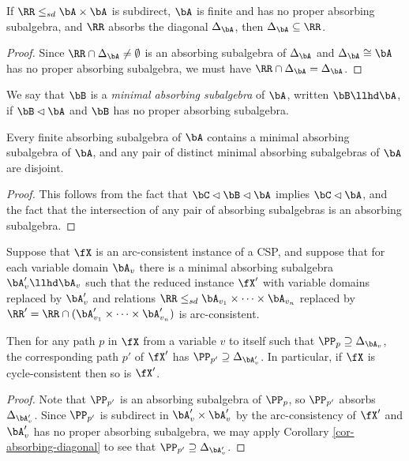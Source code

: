 \begin{cor}\label{cor-absorbing-diagonal} If $\RR \le_{sd} \bA\times \bA$ is subdirect, $\bA$ is finite and has no proper absorbing subalgebra, and $\RR$ absorbs the diagonal $\Delta_\bA$, then $\Delta_\bA \subseteq \RR$.
\end{cor}
\begin{proof} Since $\RR \cap \Delta_{\bA} \ne \emptyset$ is an absorbing subalgebra of $\Delta_{\bA}$ and $\Delta_{\bA} \cong \bA$ has no proper absorbing subalgebra, we must have $\RR \cap \Delta_\bA = \Delta_\bA$.
\end{proof}

\begin{defn} We say that $\bB$ is a \emph{minimal absorbing subalgebra} of $\bA$, written $\bB \llhd \bA$, if $\bB \lhd \bA$ and $\bB$ has no proper absorbing subalgebra.
\end{defn}

\begin{prop} Every finite absorbing subalgebra of $\bA$ contains a minimal absorbing subalgebra of $\bA$, and any pair of distinct minimal absorbing subalgebras of $\bA$ are disjoint.
\end{prop}
\begin{proof} This follows from the fact that $\bC \lhd \bB \lhd \bA$ implies $\bC \lhd \bA$, and the fact that the intersection of any pair of absorbing subalgebras is an absorbing subalgebra.
\end{proof}

\begin{thm}\label{arc-consistent-cycles} Suppose that $\fX$ is an arc-consistent instance of a CSP, and suppose that for each variable domain $\bA_v$ there is a minimal absorbing subalgebra $\bA_v' \llhd \bA_v$ such that the reduced instance $\fX'$ with variable domains replaced by $\bA_v'$ and relations $\RR \le_{sd} \bA_{v_1} \times \cdots \times \bA_{v_n}$ replaced by $\RR' = \RR \cap (\bA_{v_1}' \times \cdots \times \bA_{v_n}')$ is arc-consistent.

Then for any path $p$ in $\fX$ from a variable $v$ to itself such that $\PP_p \supseteq \Delta_{\bA_v}$, the corresponding path $p'$ of $\fX'$ has $\PP_{p'} \supseteq \Delta_{\bA_v'}$. In particular, if $\fX$ is cycle-consistent then so is $\fX'$.
\end{thm}
\begin{proof} Note that $\PP_{p'}$ is an absorbing subalgebra of $\PP_p$, so $\PP_{p'}$ absorbs $\Delta_{\bA_v'}$. Since $\PP_{p'}$ is subdirect in $\bA_v' \times \bA_v'$ by the arc-consistency of $\fX'$ and $\bA_v'$ has no proper absorbing subalgebra, we may apply Corollary \ref{cor-absorbing-diagonal} to see that $\PP_{p'} \supseteq \Delta_{\bA_v'}$.
\end{proof}


